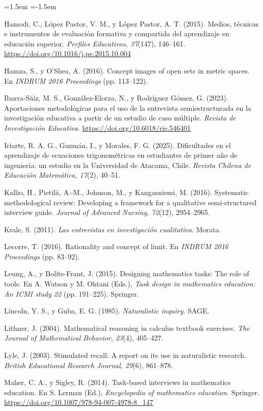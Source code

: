 \documentclass[11pt,letterpaper]{article}
\begin{document}
\begin{list}{}{\leftmargin=1.5em \itemindent=-1.5em \itemsep=3pt \parsep=0pt}
\item Hamodi, C., López Pastor, V. M., y López Pastor, A. T. (2015). Medios, técnicas e instrumentos de evaluación formativa y compartida del aprendizaje en educación superior. \emph{Perfiles Educativos, 37}(147), 146--161. \url{https://doi.org/10.1016/j.pe.2015.10.004}
\item Hamza, S., y O'Shea, A. (2016). Concept images of open sets in metric spaces. En \emph{INDRUM 2016 Proceedings} (pp. 113--122).
\item Ibarra-Sáiz, M. S., González-Elorza, N., y Rodríguez Gómez, G. (2023). Aportaciones metodológicas para el uso de la entrevista semiestructurada en la investigación educativa a partir de un estudio de caso múltiple. \emph{Revista de Investigación Educativa}. \url{https://doi.org/10.6018/rie.546401}
\item Iriarte, R. A. G., Guzmán, I., y Morales, F. G. (2025). Dificultades en el aprendizaje de ecuaciones trigonométricas en estudiantes de primer año de ingeniería: un estudio en la Universidad de Atacama, Chile. \emph{Revista Chilena de Educación Matemática, 17}(2), 40--51.
\item Kallio, H., Pietilä, A.-M., Johnson, M., y Kangasniemi, M. (2016). Systematic methodological review: Developing a framework for a qualitative semi-structured interview guide. \emph{Journal of Advanced Nursing, 72}(12), 2954--2965.
\item Kvale, S. (2011). \emph{Las entrevistas en investigación cualitativa}. Morata.
\item Lecorre, T. (2016). Rationality and concept of limit. En \emph{INDRUM 2016 Proceedings} (pp. 83--92).
\item Leung, A., y Bolite-Frant, J. (2015). Designing mathematics tasks: The role of tools. En A. Watson y M. Ohtani (Eds.), \emph{Task design in mathematics education: An ICMI study 22} (pp. 191--225). Springer.
\item Lincoln, Y. S., y Guba, E. G. (1985). \emph{Naturalistic inquiry}. SAGE.
\item Lithner, J. (2004). Mathematical reasoning in calculus textbook exercises. \emph{The Journal of Mathematical Behavior, 23}(4), 405--427.
\item Lyle, J. (2003). Stimulated recall: A report on its use in naturalistic research. \emph{British Educational Research Journal, 29}(6), 861--878.
\item Maher, C. A., y Sigley, R. (2014). Task-based interviews in mathematics education. En S. Lerman (Ed.), \emph{Encyclopedia of mathematics education}. Springer. \url{https://doi.org/10.1007/978-94-007-4978-8_147}

\end{list}
\end{document}
